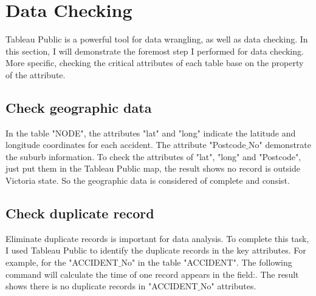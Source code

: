 \documentclass[10pt]{article}
\theoremstyle{definition}
\begin{document}
\section{Data Checking}
\label{dataChecking}
Tableau Public is a powerful tool for data wrangling, as well as data checking. In this section, I will demonstrate the foremost step I performed for data checking. More specific, checking the critical attributes of each table base on the property of the attribute.\par

\subsection{Check geographic data}
In the table "NODE", the attributes "lat" and "long" indicate the latitude and longitude coordinates for each accident. The attribute "Postcode$\_$No" demonstrate the suburb information. To check the attributes of "lat", "long" and "Postcode", just put them in the Tableau Public map, the result shows no record is outside Victoria state. So the geographic data is considered of complete and consist.\par

\subsection{Check duplicate record}
Eliminate duplicate records is important for data analysis. To complete this task, I used Tableau Public to identify the duplicate records in the key attributes. For example, for the "ACCIDENT$\_$No" in the table "ACCIDENT". The following command will calculate the time of one record appears in the field:\text{"\{fixed[Accident$\_$No:SUM([Number of Records])\}"}.
The result shows there is no duplicate records in "ACCIDENT$\_$No" attributes.\par
\end{document}

